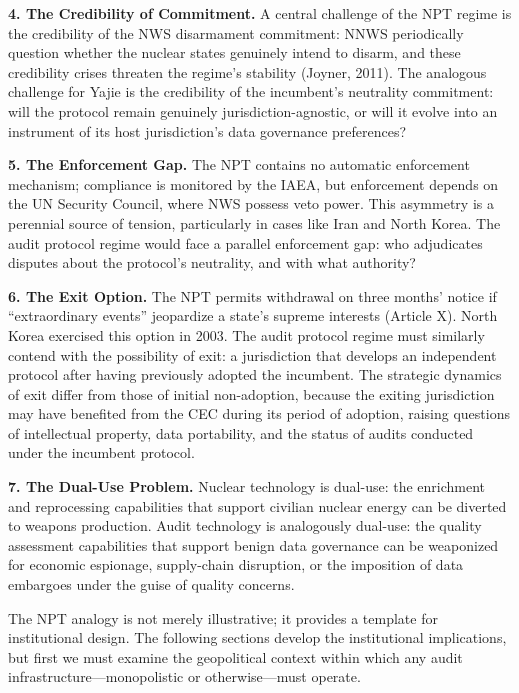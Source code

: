 \documentclass[12pt,a4paper]{article}
\theoremstyle{definition}
\theoremstyle{remark}
\begin{document}
\textbf{4. The Credibility of Commitment.} A central challenge of the NPT regime is the credibility of the NWS disarmament commitment: NNWS periodically question whether the nuclear states genuinely intend to disarm, and these credibility crises threaten the regime's stability (Joyner, 2011). The analogous challenge for Yajie is the credibility of the incumbent's neutrality commitment: will the protocol remain genuinely jurisdiction-agnostic, or will it evolve into an instrument of its host jurisdiction's data governance preferences?

\textbf{5. The Enforcement Gap.} The NPT contains no automatic enforcement mechanism; compliance is monitored by the IAEA, but enforcement depends on the UN Security Council, where NWS possess veto power. This asymmetry is a perennial source of tension, particularly in cases like Iran and North Korea. The audit protocol regime would face a parallel enforcement gap: who adjudicates disputes about the protocol's neutrality, and with what authority?

\textbf{6. The Exit Option.} The NPT permits withdrawal on three months' notice if ``extraordinary events'' jeopardize a state's supreme interests (Article X). North Korea exercised this option in 2003. The audit protocol regime must similarly contend with the possibility of exit: a jurisdiction that develops an independent protocol after having previously adopted the incumbent. The strategic dynamics of exit differ from those of initial non-adoption, because the exiting jurisdiction may have benefited from the CEC during its period of adoption, raising questions of intellectual property, data portability, and the status of audits conducted under the incumbent protocol.

\textbf{7. The Dual-Use Problem.} Nuclear technology is dual-use: the enrichment and reprocessing capabilities that support civilian nuclear energy can be diverted to weapons production. Audit technology is analogously dual-use: the quality assessment capabilities that support benign data governance can be weaponized for economic espionage, supply-chain disruption, or the imposition of data embargoes under the guise of quality concerns.

The NPT analogy is not merely illustrative; it provides a template for institutional design. The following sections develop the institutional implications, but first we must examine the geopolitical context within which any audit infrastructure—monopolistic or otherwise—must operate.
\end{document}
